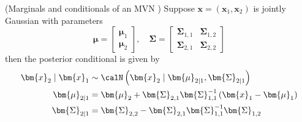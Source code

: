 \begin{thm}\label{theorem: cond_of_MVN}
    (Marginals and conditionals of an MVN \cite{MurphyKevinP2012Ml}) Suppose $\bm{x} = (\bm{x}_1, \bm{x}_2)$ is jointly Gaussian with parameters
    \[
        \bm{\mu} =
        \begin{bmatrix}
            \bm{\mu}_1 \\
            \bm{\mu}_2
        \end{bmatrix}, \quad
        \bm{\Sigma} =
        \begin{bmatrix}
            \bm{\Sigma}_{1,1} & \bm{\Sigma}_{1,2} \\
            \bm{\Sigma}_{2,1} & \bm{\Sigma}_{2,2}
        \end{bmatrix}
    \]
    then the posterior conditional is given by
    \begin{align*}
        \bm{x}_2 \mid \bm{x}_1 & \sim \calN \left( \bm{x}_2 \mid \bm{\mu}_{2 \mid 1}, \bm{\Sigma}_{2 \mid 1} \right)          \\
        \bm{\mu}_{2 \mid 1}    & = \bm{\mu}_2 + \bm{\Sigma}_{2,1} \bm{\Sigma}_{1,1}^{-1} \left( \bm{x}_1 - \bm{\mu}_1 \right) \\
        \bm{\Sigma}_{2 \mid 1} & = \bm{\Sigma}_{2,2} - \bm{\Sigma}_{2,1} \bm{\Sigma}_{1,1}^{-1} \bm{\Sigma}_{1,2}
    \end{align*}
\end{thm}


